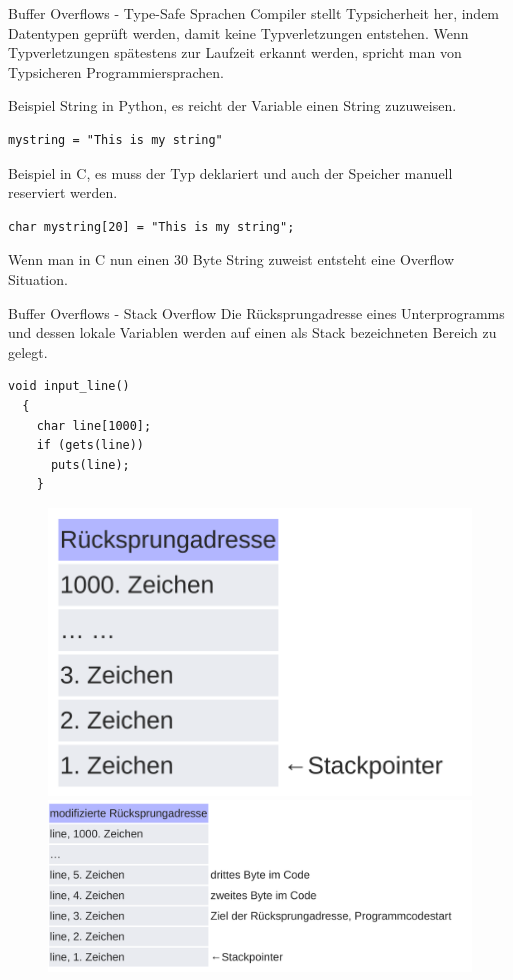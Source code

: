 \documentclass[10pt]{beamer}
\begin{document}
\begin{frame}[fragile]{Buffer Overflows - Type-Safe Sprachen}
  Compiler stellt Typsicherheit her, indem Datentypen gepr\"uft werden, damit keine Typverletzungen entstehen.
  Wenn Typverletzungen sp\"atestens zur Laufzeit erkannt werden, spricht man von Typsicheren Programmiersprachen.

  Beispiel String in Python, es reicht der Variable einen String zuzuweisen.
  \begin{lstlisting}[style=CStyle]
    mystring = "This is my string"
  \end{lstlisting}

  Beispiel in C, es muss der Typ deklariert und auch der Speicher manuell reserviert werden.
  \begin{lstlisting}[style=CStyle]
    char mystring[20] = "This is my string";
  \end{lstlisting}
  Wenn man in C nun einen 30 Byte String zuweist entsteht eine Overflow Situation.
\end{frame}

\begin{frame}[fragile]{Buffer Overflows - Stack Overflow}
 Die R\"ucksprungadresse eines Unterprogramms und dessen lokale Variablen werden auf einen als Stack bezeichneten Bereich zu gelegt.
 \begin{lstlisting}[style=CStyle]
  void input_line()
  {
    char line[1000];
    if (gets(line))
      puts(line);
    }
 \end{lstlisting}

 \begin{figure}%
  \centering
  {\includegraphics[scale=0.10]{stackoverflow}}%
  \quad
  {\includegraphics[scale=0.10]{stackoverflow_2}}%
 \end{figure}
\end{frame}
\end{document}
